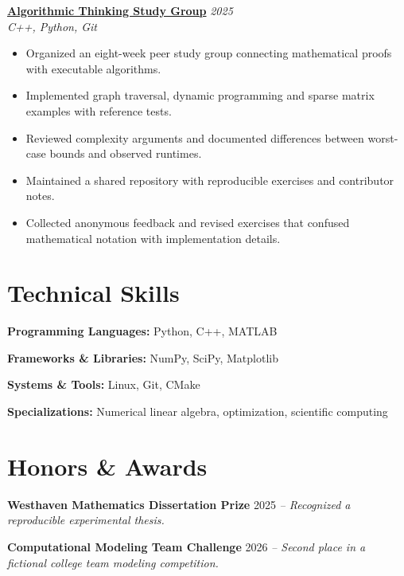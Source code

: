 \documentclass[11pt,a4paper]{article}
\begin{document}
\textbf{\href{https://example.com/demos/algorithmic-thinking-study-group}{Algorithmic Thinking Study Group}} \hfill \textit{2025}\\
\textit{C++, Python, Git}
\begin{itemize}[leftmargin=*,noitemsep,topsep=2pt]
\item Organized an eight-week peer study group connecting mathematical proofs with executable algorithms.
\item Implemented graph traversal, dynamic programming and sparse matrix examples with reference tests.
\item Reviewed complexity arguments and documented differences between worst-case bounds and observed runtimes.
\item Maintained a shared repository with reproducible exercises and contributor notes.
\item Collected anonymous feedback and revised exercises that confused mathematical notation with implementation details.
\end{itemize}

\section{Technical Skills}
\textbf{Programming Languages:} Python, C++, MATLAB

\textbf{Frameworks \& Libraries:} NumPy, SciPy, Matplotlib

\textbf{Systems \& Tools:} Linux, Git, CMake

\textbf{Specializations:} Numerical linear algebra, optimization, scientific computing

\section{Honors \& Awards}
\textbf{Westhaven Mathematics Dissertation Prize} \hfill 2025 \textit{-- Recognized a reproducible experimental thesis.}

\textbf{Computational Modeling Team Challenge} \hfill 2026 \textit{-- Second place in a fictional college team modeling competition.}
\end{document}
